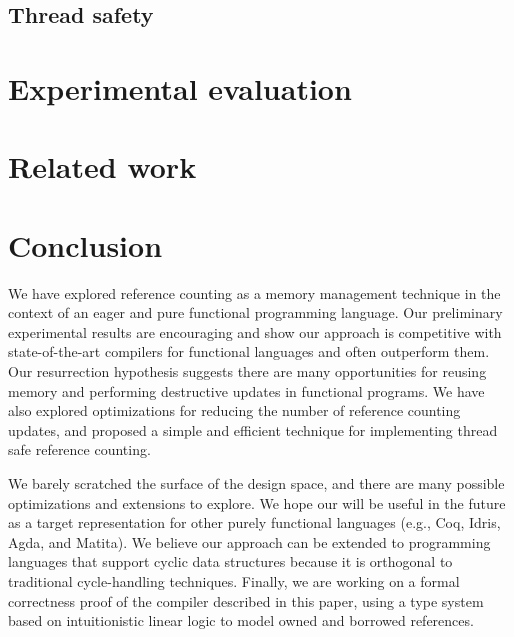 \documentclass[sigconf]{acmart}
\begin{document}


\subsection{Thread safety}



\section{Experimental evaluation}
\label{sec:evaluation}



\section{Related work}
\label{sec:related}



\section{Conclusion}

We have explored reference counting as a memory management technique
in the context of an eager and pure functional programming
language. Our preliminary experimental results are encouraging and
show our approach is competitive with state-of-the-art compilers for
functional languages and often outperform them. Our resurrection
hypothesis suggests there are many opportunities for reusing memory
and performing destructive updates in functional programs.
We have also explored optimizations for reducing the number of reference counting updates,
and proposed a simple and efficient technique for implementing thread safe reference counting.

We barely scratched the surface of the design space, and there are many
possible optimizations and extensions to explore. We hope our \pureIR{} will be useful in the future
as a target representation for other purely functional languages (e.g.,
Coq, Idris, Agda, and Matita).
We believe our approach can be extended to programming
languages that support cyclic data structures because it is orthogonal
to traditional cycle-handling techniques. Finally, we are working on a
formal correctness proof of the compiler described in this paper,
using a type system based on intuitionistic linear logic to model owned
and borrowed references.
\end{document}
